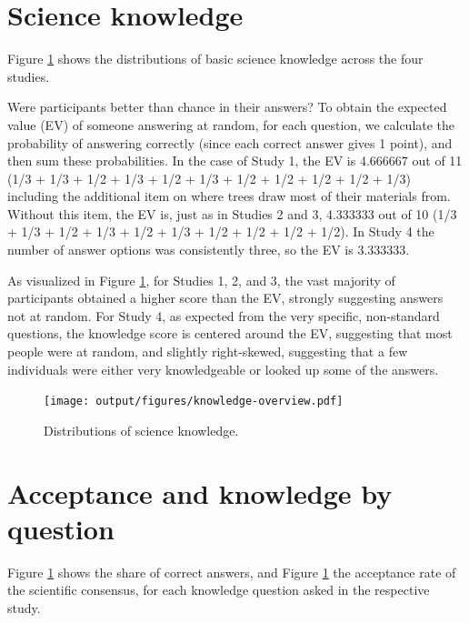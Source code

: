 \documentclass[
  doc,floatsintext]{apa6}
\begin{document}
\clearpage

\section{Science knowledge}\label{knowledge}

Figure \ref{fig:knowledge-overview} shows the distributions of basic science knowledge across the four studies.

Were participants better than chance in their answers? To obtain the expected value (EV) of someone answering at random, for each question, we calculate the probability of answering correctly (since each correct answer gives 1 point), and then sum these probabilities. In the case of Study 1, the EV is 4.666667 out of 11 (1/3 + 1/3 + 1/2 + 1/3 + 1/2 + 1/3 + 1/2 + 1/2 + 1/2 + 1/2 + 1/3) including the additional item on where trees draw most of their materials from. Without this item, the EV is, just as in Studies 2 and 3, 4.333333 out of 10 (1/3 + 1/3 + 1/2 + 1/3 + 1/2 + 1/3 + 1/2 + 1/2 + 1/2 + 1/2). In Study 4 the number of answer options was consistently three, so the EV is 3.333333.

As visualized in Figure \ref{fig:knowledge-overview}, for Studies 1, 2, and 3, the vast majority of participants obtained a higher score than the EV, strongly suggesting answers not at random. For Study 4, as expected from the very specific, non-standard questions, the knowledge score is centered around the EV, suggesting that most people were at random, and slightly right-skewed, suggesting that a few individuals were either very knowledgeable or looked up some of the answers.



\begin{figure}
\centering
\texttt{[image: output/figures/knowledge-overview.pdf]}
\caption{\label{fig:knowledge-overview}Distributions of science knowledge.}
\end{figure}

\clearpage

\section{Acceptance and knowledge by question}\label{by-question-variation}

Figure \ref{fig:knowledge-overview} shows the share of correct answers, and Figure \ref{fig:knowledge-overview} the acceptance rate of the scientific consensus, for each knowledge question asked in the respective study.
\end{document}
